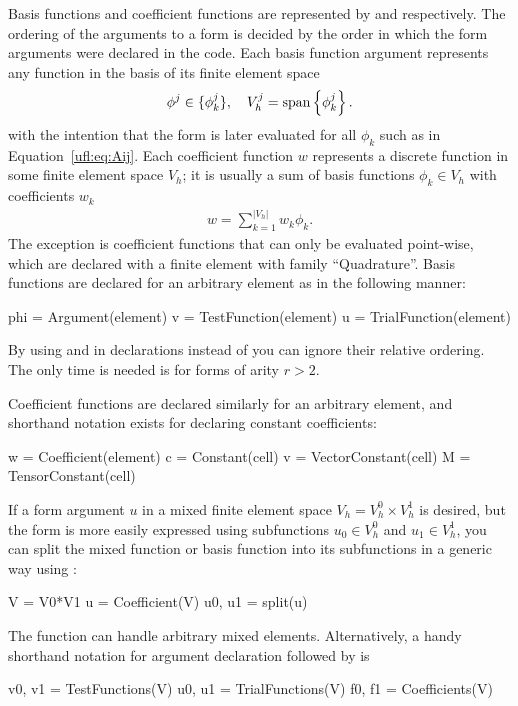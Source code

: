 Basis functions and coefficient functions are represented by
 and  respectively. The ordering of the
arguments to a form is decided by the order in which the form arguments
were declared in the \ufl{} code.  Each basis function argument represents
any function in the basis of its finite element space
\begin{align}
  \phi^j \in \{\phi_k^j\}, \quad V_h^j = \operatorname{span}\left\{ \phi_k^j \right\}.
\end{align}
with the intention that the form is later evaluated for all $\phi_k$
such as in Equation~\eqref{ufl:eq:Aij}.  Each coefficient function $w$
represents a discrete function in some finite element space $V_h$; it is
usually a sum of basis functions $\phi_k \in V_h$ with coefficients $w_k$
\begin{align}
w = \sum_{k=1}^{|V_h|} w_k \phi_k.
\end{align}
The exception is coefficient functions that can only be evaluated
point-wise, which are declared with a finite element with family
``Quadrature''.  Basis functions are declared for an arbitrary element
as in the following manner:
\begin{uflcode}
phi = Argument(element)
v = TestFunction(element)
u = TrialFunction(element)
\end{uflcode}
By using  and  in declarations
instead of  you can ignore their relative ordering.
The only time  is needed is for forms of arity $r > 2$.

Coefficient functions are declared similarly for an arbitrary element,
and shorthand notation exists for declaring constant coefficients:
\begin{uflcode}
w = Coefficient(element)
c = Constant(cell)
v = VectorConstant(cell)
M = TensorConstant(cell)
\end{uflcode}
If a form argument $u$ in a mixed finite element space $V_h = V_h^0
\times V_h^1$ is desired, but the form is more easily expressed using
subfunctions $u_0 \in V_h^0$ and $u_1 \in V_h^1$, you can split the
mixed function or basis function into its subfunctions in a generic way
using :
\begin{uflcode}
V = V0*V1
u = Coefficient(V)
u0, u1 = split(u)
\end{uflcode}
The  function can handle arbitrary mixed elements.
Alternatively, a handy shorthand notation for argument declaration
followed by  is
\begin{uflcode}
v0, v1 = TestFunctions(V)
u0, u1 = TrialFunctions(V)
f0, f1 = Coefficients(V)
\end{uflcode}
